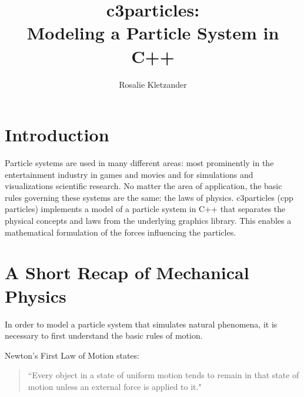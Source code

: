 \documentclass[runningheads,a4paper]{llncs}
\begin{document}
\mainmatter  %

\title{c3particles: \\ Modeling a Particle System in C++}


%
\author{Rosalie Kletzander}
%


\maketitle


\section{Introduction}
Particle systems are used in many different areas: most prominently in the entertainment industry in games and movies and for simulations and visualizations scientific research. No matter the area of application, the basic rules governing these systems are the same: the laws of physics. c3particles (cpp particles) implements a model of a particle system in C++ that separates the physical concepts and laws from the underlying graphics library. This enables a mathematical formulation of the forces influencing the particles.


\section{A Short Recap of Mechanical Physics}

In order to model a particle system that simulates natural phenomena, it is necessary to first understand the basic rules of motion.

Newton's First Law of Motion states:
\begin{quotation}
``Every object in a state of uniform motion tends to remain in that state of motion unless an external force is applied to it." \cite{Newton}
\end{quotation}
\end{document}
